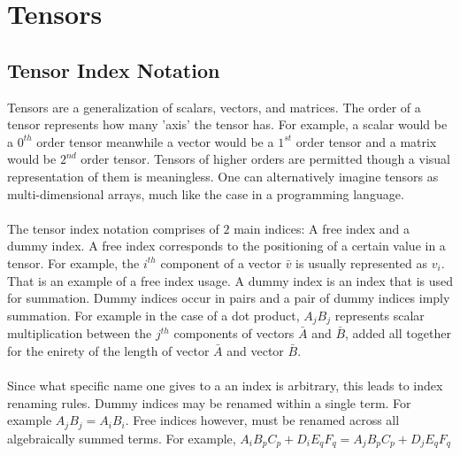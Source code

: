 \chapter{Tensors}
\begin{comment}
\end{comment}
\section{Tensor Index Notation}
\begin{comment}
\end{comment}
Tensors are a generalization of scalars, vectors, and matrices. The order of a tensor represents how many 'axis' the tensor has. For example, a scalar would be a $0^{th}$ order tensor meanwhile a vector would be a $1^{st}$ order tensor and a matrix would be $2^{nd}$ order tensor. Tensors of higher orders are permitted though a visual representation of them is meaningless. One can alternatively imagine tensors as multi-dimensional arrays, much like the case in a programming language.
 \\~\\The tensor index notation comprises of $2$ main indices: A free index and a dummy index. A free index corresponds to the positioning of a certain value in a tensor. For example, the $i^{th}$ component of a vector $\bar{v}$ is usually represented as $v_{i}$. That is an example of a free index usage. A dummy index is an index that is used for summation. Dummy indices occur in pairs and a pair of dummy indices imply summation. For example in the case of a dot product, $A_{j}B_{j}$ represents scalar multiplication between the $j^{th}$ components of vectors $\bar{A}$ and $\bar{B}$, added all together for the enirety of the length of vector $\bar{A}$ and vector $\bar{B}$.
\\~\\Since what specific name one gives to a an index is arbitrary, this leads to index renaming rules. Dummy indices may be renamed within a single term. For example $A_{j}B_{j} = A_{i}B_{i}$. Free indices however, must be renamed across all algebraically summed terms. For example, $A_{i}B_{p}C_{p} + D_{i}E_{q}F_{q} = A_{j}B_{p}C_{p} + D_{j}E_{q}F_{q}$
